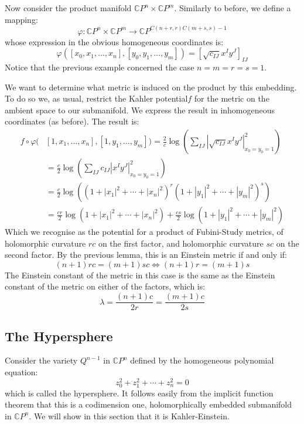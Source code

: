 \documentclass[11pt]{amsart}
\theoremstyle{definition}
\def \CP{ \mathbb{C}P }
\begin{document}
Now consider the product manifold $\CP^{n} \times \CP^{m}$.  Similarly to before, we define a mapping:
%
$$ \varphi : \CP^{n} \times \CP^{m} \rightarrow \CP^{ C(n + r, r) C( m + s, s) - 1} $$
%
whose expression in the obvious homogeneous coordinates is:
%
$$ \varphi( [x_0, x_1, \ldots, x_n], [y_0, y_1, \ldots, y_m] ) = [ \sqrt{c_{IJ}} x^I y^J ]_{IJ} $$
%
Notice that the previous example concerned the case $n=m=r=s=1$.  

We want to determine what metric is induced on the product by this embedding.  To do so we, as usual, restrict the Kahler potential$f$ for the metric on the ambient space to our submanifold.  We express the result in inhomogeneous coordinates (as before). The result is:
%
\begin{align*}
f \circ \varphi( & [1, x_1, \ldots, x_n], [1, y_1, \ldots, y_m] ) = \frac{2}{c} \log \left( \sum_{IJ} | \sqrt{c_{IJ}} x^I y^J |^2_{x_0 = y_0 = 1} \right) \\
&= \frac{c}{2} \log \left( \sum_{IJ} c_{IJ} |x^I y^J|^2_{x_0 = y_0 = 1} \right) \\
&= \frac{c}{2} \log \left( (1 + |x_1|^2 + \cdots + |x_n|^2 )^r (1 + |y_1|^2 + \cdots + |y_m|^2 )^s \right) \\
&= \frac{cr}{2} \log ( 1 + |x_1|^2 + \cdots + |x_n|^2 ) + \frac{cs}{2} \log (1 + |y_1|^2 + \cdots + |y_m|^2 )
\end{align*}
%
Which we recognise as the potential for a product of Fubini-Study metrics, of holomorphic curvature $rc$ on the first factor, and holomorphic curvature $sc$ on the second factor.  By the previous lemma, this is an Einstein metric if and only if:
%
$$ (n+1)rc = (m+1)sc \Leftrightarrow (n+1)r = (m+1)s $$
%
The Einstein constant of the metric in this case is the same as the Einstein constant of the metric on either of the factors, which is:
%
$$ \lambda = \frac{(n+1)c}{2r} = \frac{(m+1)c}{2s} $$

\subsection{ The Hypersphere }

Consider the variety $Q^{n-1}$ in $\CP^n$ defined by the homogeneous polynomial equation:
%
$$ z_0^2 + z_1^2 + \cdots + z_n^2 = 0 $$
%
which is called the hypersphere.  It follows easily from the implicit function theorem that this is a codimension one, holomorphically embedded submanifold in $\CP^n$.  We will show in this section that it is Kahler-Einstein.
\end{document}
